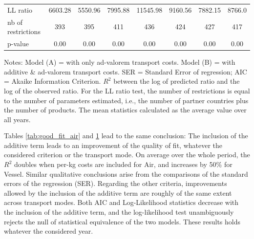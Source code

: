 \documentclass[a4paper,11pt]{article}
\begin{document}
\begin{table}[htbp]
{\begin{center}
\begin{tabular}{l|cccccc|c}
    LL ratio & \multicolumn{1}{c}{6603.28} & \multicolumn{1}{c}{5550.96} & \multicolumn{1}{c}{7995.88} & \multicolumn{1}{c}{11545.98} & 9160.56 & \multicolumn{1}{c}{7882.15} & 8766.0 \\
    nb of restrictions & \multicolumn{1}{c}{393} & \multicolumn{1}{c}{395} & \multicolumn{1}{c}{411} & \multicolumn{1}{c}{436} & 424   & \multicolumn{1}{c}{427} & 417 \\
    p-value& \multicolumn{1}{c}{0.00} & \multicolumn{1}{c}{0.00} & \multicolumn{1}{c}{0.00} & \multicolumn{1}{c}{0.00} & 0.00  & \multicolumn{1}{c}{0.00} & 0.00 \\
    \hline \hline
    \end{tabular}%
    \end{center}}
  \label{tab:good_fit_vessel}%
  \parbox[l]{12cm}{\tiny{Notes: Model (A) = with only ad-valorem transport costs. Model (B) = with additive \& ad-valorem transport costs. SER = Standard Error of regression; AIC = Akaike Information Criterion. $R^{2}$ between the log of predicted ratio and the log of the observed ratio. For the LL ratio test, the number of restrictions is equal to the number of parameters estimated, i.e., the number of partner countries plus the number of products. The mean statistics calculated as the average value over all years. }}
\end{table}%


Tables \ref{tab:good_fit_air} and \ref{tab:good_fit_vessel} lead to the same conclusion: The inclusion of the additive term leads to an improvement of the quality of fit, whatever the considered criterion or the transport mode. On average over the whole period, the $R^{2}$ doubles when per-kg costs are included for Air, and increases by 50\% for Vessel. Similar qualitative conclusions arise from the comparisons of the standard errors of the regression (SER). Regarding the other criteria, improvements allowed by the inclusion of the additive term are roughly of the same extent across transport modes. Both AIC and Log-Likelihood statistics decrease with the inclusion of the additive term, and the log-likelihood test unambiguously rejects the null of statistical equivalence of the two models. These results holds whatever the considered year.\smallskip
\end{document}
